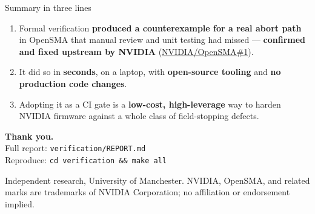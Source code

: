 \documentclass[aspectratio=169,11pt]{beamer}
\newcommand{\hil}[1]{\textbf{\textcolor{nvgreendark}{#1}}}
\begin{document}
\begin{frame}{Summary in three lines}
  \vspace{1.2em}
  \begin{block}{}
    \large
    \begin{enumerate}
      \item Formal verification \hil{produced a counterexample for a real
            abort path} in OpenSMA that manual review and unit testing
            had missed --- \hil{confirmed and fixed upstream by NVIDIA}
            (\href{https://github.com/NVIDIA/OpenSMA/issues/1}{NVIDIA/OpenSMA\#1}).
      \item It did so in \hil{seconds}, on a laptop, with \hil{open-source
            tooling} and \hil{no production code changes}.
      \item Adopting it as a CI gate is a \hil{low-cost, high-leverage}
            way to harden NVIDIA firmware against a whole class of
            field-stopping defects.
    \end{enumerate}
  \end{block}

  \vspace{1.0em}
  \centering
  \large \textcolor{nvgreendark}{\textbf{Thank you.}} \\
  \vspace{0.4em}
  \footnotesize
  Full report: \texttt{verification/REPORT.md} \\
  Reproduce: \texttt{cd verification \&\& make all}

  \vspace{0.8em}
  {\tiny\textcolor{nvgray}{Independent research, University of Manchester.
  NVIDIA, OpenSMA, and related marks are trademarks of NVIDIA Corporation;
  no affiliation or endorsement implied.}}
\end{frame}

\appendix
\end{document}
